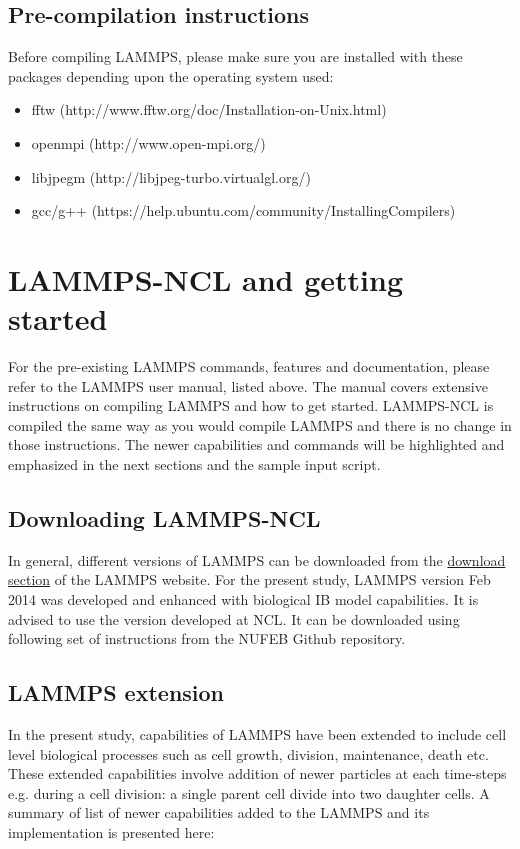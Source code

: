 \documentclass[11pt,a4paper,openright]{article}
\begin{document}
\subsection{Pre-compilation instructions}

Before compiling LAMMPS, please make sure you are installed with these packages depending upon the operating system used:

\begin{itemize}
\item fftw (http://www.fftw.org/doc/Installation-on-Unix.html)
\item openmpi (http://www.open-mpi.org/)
\item libjpegm (http://libjpeg-turbo.virtualgl.org/)
\item gcc/g++ (https://help.ubuntu.com/community/InstallingCompilers)
\end{itemize} 

\section{LAMMPS-NCL and getting started}

For the pre-existing LAMMPS commands, features and documentation, please refer to the LAMMPS user manual, listed above. The manual covers extensive instructions on compiling LAMMPS and how to get started. LAMMPS-NCL is compiled the same way as you would compile LAMMPS and there is no change in those instructions. The newer capabilities and commands will be highlighted and emphasized in the next sections and the sample input script.  


\subsection{Downloading LAMMPS-NCL}
In general, different versions of LAMMPS can be downloaded from the \href{http://lammps.sandia.gov/download.html}{download section} of the LAMMPS website. For the present study, LAMMPS version Feb 2014 was developed and enhanced with biological IB model capabilities. It is advised to use the version developed at NCL. It can be downloaded using following set of instructions from the NUFEB Github repository.


\subsection{LAMMPS extension}
In the present study, capabilities of LAMMPS have been extended to include cell level biological processes such as cell growth, division, maintenance, death etc. These extended capabilities involve addition of newer particles at each time-steps e.g. during a cell division: a single parent cell divide into two daughter cells. A summary of list of newer capabilities added to the LAMMPS and its implementation is presented here:
\end{document}
